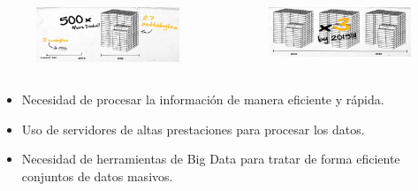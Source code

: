 {
		
	\begin{frame}{}
		\begin{columns}[c]
			\begin{figure}[H]
				\centering
				\includegraphics[width=5cm]{./Images/data2.png}
			\end{figure}
					
		
			\begin{figure}[H]
				\centering
				\includegraphics[width=5cm]{./Images/data3.png}
			\end{figure}
		\end{columns}

		
		\begin{itemize}
			\item Necesidad de procesar la información de manera eficiente y rápida.
			\item Uso de servidores de altas prestaciones para procesar los datos.
			\item Necesidad de herramientas de Big Data para tratar de forma eficiente conjuntos de datos masivos.
		\end{itemize}
	\end{frame}
}